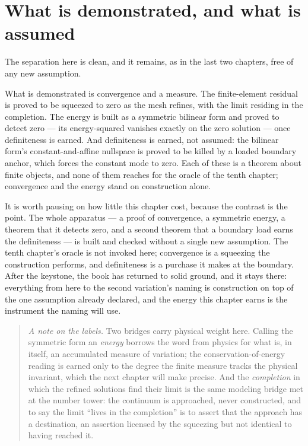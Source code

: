 \section{What is demonstrated, and what is assumed}
\label{se:demonstrated-assumed-ch12}

The separation here is clean, and it remains, as in the last two chapters, free of any new assumption.

What is demonstrated is convergence and a measure. The finite-element residual is proved to be squeezed
to zero as the mesh refines, with the limit residing in the completion. The energy is built as a
symmetric bilinear form and proved to detect zero --- its energy-squared vanishes exactly on the zero
solution --- once definiteness is earned. And definiteness is earned, not assumed: the bilinear form's
constant-and-affine nullspace is proved to be killed by a loaded boundary anchor, which forces the
constant mode to zero. Each of these is a theorem about finite objects, and none of them reaches for
the oracle of the tenth chapter; convergence and the energy stand on construction alone.

It is worth pausing on how little this chapter cost, because the contrast is the point. The whole
apparatus --- a proof of convergence, a symmetric energy, a theorem that it detects zero, and a second
theorem that a boundary load earns the definiteness --- is built and checked without a single new
assumption. The tenth chapter's oracle is not invoked here; convergence is a squeezing the construction
performs, and definiteness is a purchase it makes at the boundary. After the keystone, the book has
returned to solid ground, and it stays there: everything from here to the second variation's naming is
construction on top of the one assumption already declared, and the energy this chapter earns is the
instrument the naming will use.

\begin{quote}
\emph{A note on the labels.} Two bridges carry physical weight here. Calling the symmetric form an
\emph{energy} borrows the word from physics for what is, in itself, an accumulated measure of
variation; the conservation-of-energy reading is earned only to the degree the finite measure tracks
the physical invariant, which the next chapter will make precise. And the \emph{completion} in which the
refined solutions find their limit is the same modeling bridge met at the number tower: the continuum is
approached, never constructed, and to say the limit ``lives in the completion'' is to assert that the
approach has a destination, an assertion licensed by the squeezing but not identical to having reached
it.
\end{quote}

